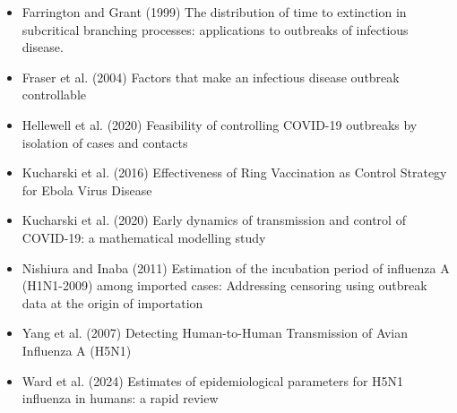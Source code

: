 \documentclass{article}
\begin{document}
\begin{itemize}
\item Farrington and Grant (1999) The distribution of time to extinction in subcritical branching processes: applications to outbreaks of infectious disease.
\item Fraser et al. (2004) Factors that make an infectious disease outbreak controllable
\item Hellewell et al. (2020) Feasibility of controlling COVID-19 outbreaks by isolation of cases and contacts
\item Kucharski et al. (2016) Effectiveness of Ring Vaccination as Control Strategy for Ebola Virus Disease
\item Kucharski et al. (2020) Early dynamics of transmission and control of COVID-19: a mathematical modelling study
\item Nishiura and Inaba (2011) Estimation of the incubation period of influenza A (H1N1-2009) among imported cases: Addressing censoring using outbreak data at the origin of importation
\item Yang et al. (2007) Detecting Human-to-Human Transmission of Avian Influenza A (H5N1)
\item Ward et al. (2024) Estimates of epidemiological parameters for H5N1 influenza in humans: a rapid review
\end{itemize}
\end{document}
